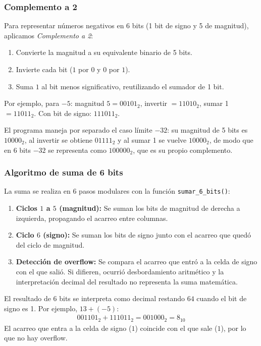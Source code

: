 \documentclass[a4paper,12pt]{article}
\begin{document}
\subsubsection{Complemento a 2}

Para representar n\'{u}meros negativos en 6 bits (1 bit de signo y 5 de magnitud), aplicamos \textit{Complemento a 2}:
\begin{enumerate}
    \item Convierte la magnitud a su equivalente binario de 5 bits.
    \item Invierte cada bit ($1$ por $0$ y $0$ por $1$).
    \item Suma $1$ al bit menos significativo, reutilizando el sumador de 1 bit.
\end{enumerate}

Por ejemplo, para $-5$: magnitud $5 = 00101_2$, invertir $= 11010_2$, sumar 1 $= 11011_2$. Con bit de signo: $111011_2$.

El programa maneja por separado el caso l\'{i}mite $-32$: su magnitud de 5 bits es $10000_2$, al invertir se obtiene $01111_2$ y al sumar 1 se vuelve $10000_2$, de modo que en 6 bits $-32$ se representa como $100000_2$, que es su propio complemento.

\subsubsection{Algoritmo de suma de 6 bits}

La suma se realiza en 6 pasos modulares con la funci\'{o}n \texttt{sumar\_6\_bits()}:
\begin{enumerate}
    \item \textbf{Ciclos $1$ a $5$ (magnitud):} Se suman los bits de magnitud de derecha a izquierda, propagando el acarreo entre columnas.
    \item \textbf{Ciclo $6$ (signo):} Se suman los bits de signo junto con el acarreo que qued\'{o} del ciclo de magnitud.
    \item \textbf{Detecci\'{o}n de overflow:} Se compara el acarreo que entr\'{o} a la celda de signo con el que sali\'{o}. Si difieren, ocurri\'{o} desbordamiento aritm\'{e}tico y la interpretaci\'{o}n decimal del resultado no representa la suma matem\'{a}tica.
\end{enumerate}

El resultado de 6 bits se interpreta como decimal restando $64$ cuando el bit de signo es 1. Por ejemplo, $13 + (-5)$:
\begin{align*}
    001101_2 + 111011_2 = 001000_2 = 8_{10}
\end{align*}
El acarreo que entra a la celda de signo ($1$) coincide con el que sale ($1$), por lo que no hay overflow.
\end{document}
